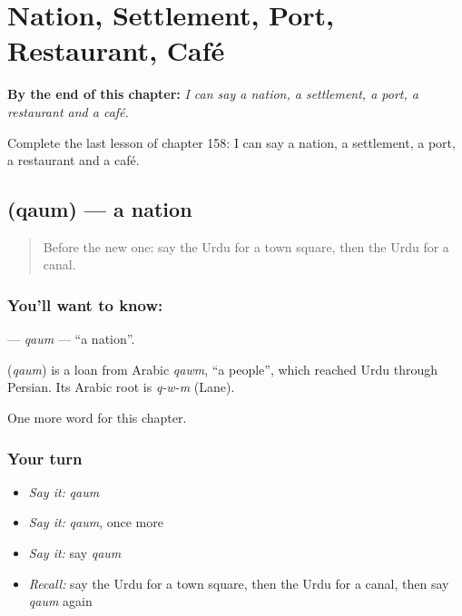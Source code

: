 
\chapter{Nation, Settlement, Port, Restaurant, Café}
\label{ch:ur-nation-settlement-port-restaurant-cafe}

\begin{chapteropening}
\textbf{By the end of this chapter:} \emph{I can say a nation, a settlement, a port, a restaurant and a café.}

Complete the last lesson of chapter 158: I can say a nation, a settlement, a port, a restaurant and a café.
\end{chapteropening}

\section[\texorpdfstring{\ur{قوم} (qaum)}{قوم (qaum)}]{ (qaum) — a nation}

\label{lesson:UR-C158-qaum}



\begin{quote}
Before the new one: say the Urdu for a town square, then the Urdu for a canal.
\end{quote}

\subsection*{You'll want to know: }
\textbf{} — \emph{qaum} — \textquotedblleft{}a nation\textquotedblright{}.

\begin{cousinweb}
\textbf{} (\emph{qaum}) is a loan from Arabic \emph{qawm}, \textquotedblleft{}a people\textquotedblright{}, which reached Urdu through Persian. Its Arabic root is \emph{q-w-m} (Lane).
\end{cousinweb}

\begin{grammarlens}[title={What you've built}]
One more word for this chapter.
\end{grammarlens}

\subsection*{Your turn}
\begin{itemize}
\raggedright
  \item \emph{Say it:} \emph{qaum}
  \item \emph{Say it:} \emph{qaum}, once more
  \item \emph{Say it:} say \emph{qaum}
  \item \emph{Recall:} say the Urdu for a town square, then the Urdu for a canal, then say \emph{qaum} again
\end{itemize}


